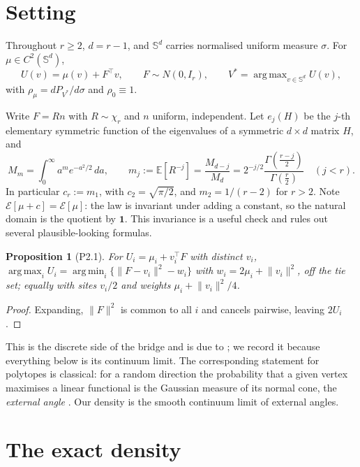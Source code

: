 \documentclass[11pt]{article}
\newtheorem{proposition}[theorem]{Proposition}
\theoremstyle{definition}
\DeclareMathOperator*{\argmax}{arg\,max}
\DeclareMathOperator*{\argmin}{arg\,min}
\newcommand{\E}{\mathbb{E}}
\newcommand{\Sph}{\mathbb{S}}
\newcommand{\one}{\mathbf{1}}
\begin{document}
\section{Setting}

Throughout $r\ge2$, $d=r-1$, and $\Sph^{d}$ carries normalised uniform measure
$\sigma$. For $\mu\in C^{2}(\Sph^{d})$,
\[
  U(v)=\mu(v)+F^{\top}v,\qquad F\sim N(0,I_{r}),\qquad
  V^{*}=\argmax_{v\in\Sph^{d}}U(v),
\]
with $\rho_{\mu}=dP_{V^{*}}/d\sigma$ and $\rho_{0}\equiv1$.

Write $F=Rn$ with
$R\sim\chi_{r}$ and $n$ uniform, independent. Let $e_{j}(H)$ be the $j$-th
elementary symmetric function of the eigenvalues of a symmetric $d\times d$
matrix $H$, and
\begin{equation}\label{eq:M}
  M_{m}=\int_{0}^{\infty}a^{m}e^{-a^{2}/2}\,da,
  \qquad
  m_{j}:=\E[R^{-j}]=\frac{M_{d-j}}{M_{d}}
  =2^{-j/2}\frac{\Gamma(\frac{r-j}{2})}{\Gamma(\frac r2)}\quad(j<r).
\end{equation}
In particular $c_{r}:=m_{1}$, with $c_{2}=\sqrt{\pi/2}$, and $m_{2}=1/(r-2)$
for $r>2$. Note $\mathcal{E}[\mu+c]=\mathcal{E}[\mu]$: the law is invariant
under adding a constant, so the natural domain is the quotient by $\one$. This
invariance is a useful check and rules out several plausible-looking formulas.

\begin{proposition}[\textsf{P2.1}]\label{prop:power}
For $U_{i}=\mu_{i}+v_{i}^{\top}F$ with distinct $v_{i}$,
$\argmax_{i}U_{i}=\argmin_{i}\{\lVert F-v_{i}\rVert^{2}-w_{i}\}$ with
$w_{i}=2\mu_{i}+\lVert v_{i}\rVert^{2}$, off the tie set; equally with sites
$v_{i}/2$ and weights $\mu_{i}+\lVert v_{i}\rVert^{2}/4$.
\end{proposition}
\begin{proof}
Expanding, $\lVert F\rVert^{2}$ is common to all $i$ and cancels pairwise,
leaving $2U_{i}$.
\end{proof}

This is the discrete side of the bridge and is due to \cite{GS}; we record it
because everything below is its continuum limit. The corresponding statement
for polytopes is classical: for a random direction the probability that a given
vertex maximises a linear functional is the Gaussian measure of its normal
cone, the \emph{external angle} \cite{SchneiderWeil,AmelunxenEtAl}. Our density
is the smooth continuum limit of external angles.

\section{The exact density}\label{sec:exact}
\end{document}
